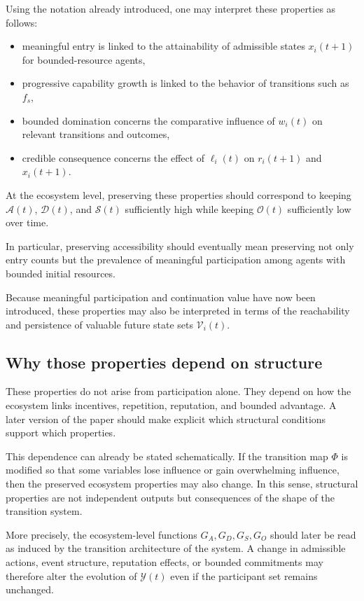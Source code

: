 \documentclass[11pt]{article}
\begin{document}
Using the notation already introduced, one may interpret these properties as follows:
\begin{itemize}
  \item meaningful entry is linked to the attainability of admissible states \(x_i(t+1)\) for bounded-resource agents,
  \item progressive capability growth is linked to the behavior of transitions such as \(f_s\),
  \item bounded domination concerns the comparative influence of \(w_i(t)\) on relevant transitions and outcomes,
  \item credible consequence concerns the effect of \(\ell_i(t)\) on \(r_i(t+1)\) and \(x_i(t+1)\).
\end{itemize}

At the ecosystem level, preserving these properties should correspond to keeping \(\mathcal{A}(t)\), \(\mathcal{D}(t)\), and \(\mathcal{S}(t)\) sufficiently high while keeping \(\mathcal{O}(t)\) sufficiently low over time.

In particular, preserving accessibility should eventually mean preserving not only entry counts but the prevalence of meaningful participation among agents with bounded initial resources.

Because meaningful participation and continuation value have now been introduced, these properties may also be interpreted in terms of the reachability and persistence of valuable future state sets \(\mathcal{V}_i(t)\).

\subsection{Why those properties depend on structure}

These properties do not arise from participation alone. They depend on how the ecosystem links incentives, repetition, reputation, and bounded advantage. A later version of the paper should make explicit which structural conditions support which properties.

This dependence can already be stated schematically. If the transition map \(\Phi\) is modified so that some variables lose influence or gain overwhelming influence, then the preserved ecosystem properties may also change. In this sense, structural properties are not independent outputs but consequences of the shape of the transition system.

More precisely, the ecosystem-level functions \(G_A, G_D, G_S, G_O\) should later be read as induced by the transition architecture of the system. A change in admissible actions, event structure, reputation effects, or bounded commitments may therefore alter the evolution of \(\mathcal{Y}(t)\) even if the participant set remains unchanged.
\end{document}

